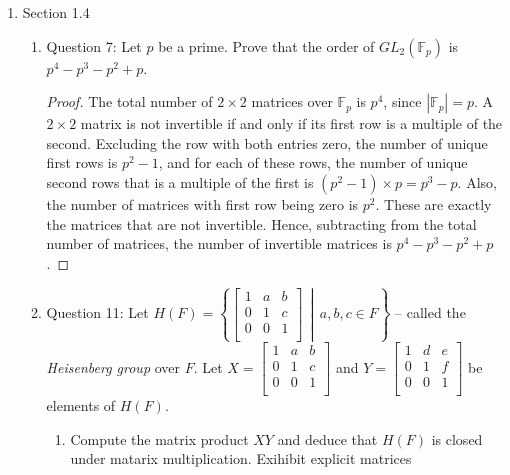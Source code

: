 \documentclass{article}
\begin{document}
\begin{enumerate}
  \item Section 1.4
    \begin{enumerate}
      \item Question 7: Let $p$ be a prime. Prove that the order of
        $GL_2(\mathbb{F}_p)$ is $p^4-p^3-p^2+p$.
        \begin{proof}
          The total number of $2\times 2$ matrices over $\mathbb{F}_p$ is
          $p^4$, since $|\mathbb{F}_p|=p$. A $2\times 2$ matrix is not
          invertible if and only if its first row is a multiple of the
          second. Excluding the row with both entries zero, the number of
          unique first rows is $p^2-1$, and for each of these rows, the
          number of unique second rows that is a multiple of the first is
          $(p^2-1)\times p = p^3-p$. Also, the number of matrices with
          first row being zero is $p^2$. These are exactly the matrices
          that are not invertible. Hence, subtracting from the total number
          of matrices, the number of invertible matrices is
          $p^4-p^3-p^2+p$.
        \end{proof}
      \item Question 11: Let
        $H(F) = \left \{
          \begin{bmatrix}
            1 & a & b \\
            0 & 1 & c \\
            0 & 0 & 1 \\
          \end{bmatrix}
        \,\middle|\,a,b,c\in F\right\}$ -- called the \textit{Heisenberg
        group} over $F$. Let
        $X =
          \begin{bmatrix}
            1 & a & b \\
            0 & 1 & c \\
            0 & 0 & 1 \\
          \end{bmatrix} $
        and
        $Y =
          \begin{bmatrix}
            1 & d & e \\
            0 & 1 & f \\
            0 & 0 & 1 \\
          \end{bmatrix} $
        be elements of $H(F)$.
        \begin{enumerate}
          \item Compute the matrix product $XY$ and deduce that $H(F)$ is
            closed under matarix multiplication. Exihibit explicit matrices

\end{enumerate}
\end{enumerate}
\end{enumerate}
\end{document}
